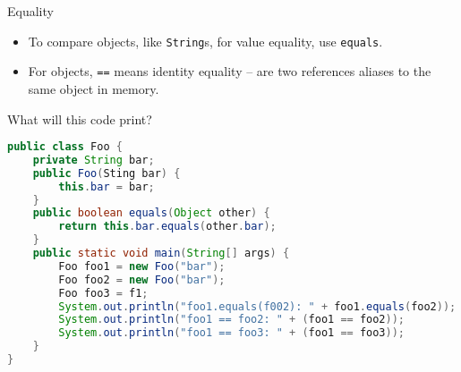 \documentclass{beamer}
\begin{document}
\begin{frame}[fragile]{Equality}
\vspace{-.05in}
\begin{itemize}
\item To compare objects, like {\tt String}s, for value equality, use {\tt equals}.
\item For objects, {\tt ==} means identity equality -- are two references aliases to the same object in memory.
\end{itemize}

What will this code print?
\begin{lstlisting}[language=Java]
public class Foo {
    private String bar;
    public Foo(Sting bar) {
        this.bar = bar;
    }
    public boolean equals(Object other) {
        return this.bar.equals(other.bar);
    }
    public static void main(String[] args) {
        Foo foo1 = new Foo("bar");
        Foo foo2 = new Foo("bar");
        Foo foo3 = f1;
        System.out.println("foo1.equals(f002): " + foo1.equals(foo2));
        System.out.println("foo1 == foo2: " + (foo1 == foo2));
        System.out.println("foo1 == foo3: " + (foo1 == foo3));
    }
}
\end{lstlisting}

\end{frame}







\end{document}
